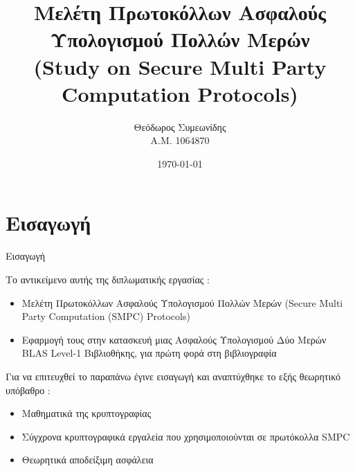 \documentclass[10pt]{beamer}
\title[Μελέτη Πρωτοκόλλων Ασφαλούς Υπολογισμού Πολλών Μερών]{Μελέτη Πρωτοκόλλων Ασφαλούς Υπολογισμού Πολλών Μερών \\ (Study on Secure Multi Party Computation Protocols)}%
\author[Θεόδωρος Συμεωνίδης Α.Μ. 1064870]{Θεόδωρος Συμεωνίδης \\ Α.Μ. 1064870}
\institute[]{Τμήμα Μηχανικών Η/Υ και Πληροφορίκής \\ Πανεπιστήμιο Πατρών}
\date[\textcolor{white}{Τμήμα Μηχανικών Η/Υ και Πληροφορικής}]
{\today}
\begin{document}
    \begin{frame}
        \titlepage
    \end{frame}

    \section{Εισαγωγή}
    \begin{frame}{Εισαγωγή}
        \begin{block}{}
            Το αντικείμενο αυτής της διπλωματικής εργασίας :
            \begin{itemize}
                \item Μελέτη Πρωτοκόλλων Ασφαλούς Υπολογισμού Πολλών Μερών (Secure Multi Party Computation (SMPC) Protocols)
                \item Εφαρμογή τους στην κατασκευή μιας Ασφαλούς Υπολογισμού Δύο Μερών BLAS Level-1 Βιβλιοθήκης, για πρώτη φορά στη βιβλιογραφία
            \end{itemize}
        \end{block}
        \begin{block}{}
            Για να επιτευχθεί το παραπάνω έγινε εισαγωγή και αναπτύχθηκε το εξής θεωρητικό υπόβαθρο :
            \begin{itemize}
                \item Μαθηματικά της κρυπτογραφίας
                \item Σύγχρονα κρυπτογραφικά εργαλεία που χρησιμοποιούνται σε πρωτόκολλα SMPC
                \item Θεωρητικά αποδείξιμη ασφάλεια
            \end{itemize}
        \end{block}
    \end{frame}
\end{document}
